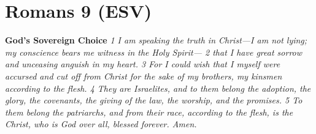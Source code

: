 \hypertarget{romans-9-esv}{%
\section{Romans 9 (ESV)}\label{romans-9-esv}}

\textbf{God's Sovereign Choice} \emph{1 I am speaking the truth in
Christ---I am not lying; my conscience bears me witness in the Holy
Spirit--- 2 that I have great sorrow and unceasing anguish in my heart.
3 For I could wish that I myself were accursed and cut off from Christ
for the sake of my brothers, my kinsmen according to the flesh. 4 They
are Israelites, and to them belong the adoption, the glory, the
covenants, the giving of the law, the worship, and the promises. 5 To
them belong the patriarchs, and from their race, according to the flesh,
is the Christ, who is God over all, blessed forever. Amen.}

